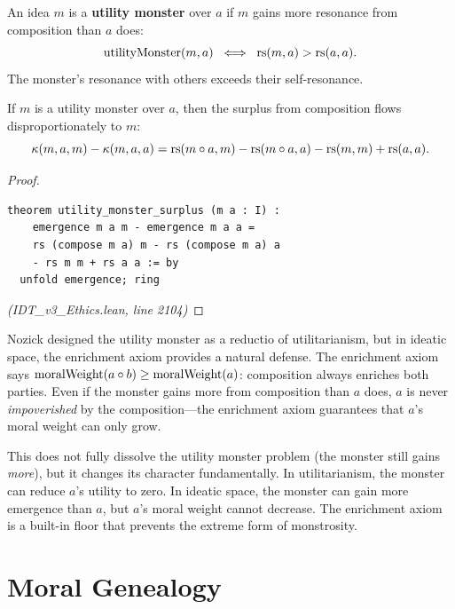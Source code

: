 \begin{definition}
\label{def:utility-monster}
An idea $m$ is a \textbf{utility monster} over $a$ if $m$ gains more
resonance from composition than $a$ does:
\[
  \mathrm{utilityMonster}(m, a) \;\iff\; \mathrm{rs}(m, a) > \mathrm{rs}(a, a).
\]
The monster's resonance with others exceeds their self-resonance.
\end{definition}

\begin{theorem}
\label{thm:monster-extraction}
If $m$ is a utility monster over $a$, then the surplus from composition
flows disproportionately to $m$:
\[
  \kappa(m, a, m) - \kappa(m, a, a) = \mathrm{rs}(m \circ a, m) - \mathrm{rs}(m \circ a, a) - \mathrm{rs}(m, m) + \mathrm{rs}(a, a).
\]
\end{theorem}

\begin{proof}
\begin{lstlisting}
theorem utility_monster_surplus (m a : I) :
    emergence m a m - emergence m a a =
    rs (compose m a) m - rs (compose m a) a
    - rs m m + rs a a := by
  unfold emergence; ring
\end{lstlisting}
\textit{(IDT\_v3\_Ethics.lean, line 2104)}
\end{proof}

\begin{interpretation}
Nozick designed the utility monster as a reductio of utilitarianism, but
in ideatic space, the enrichment axiom provides a natural defense. The
enrichment axiom says $\mathrm{moralWeight}(a \circ b) \geq
\mathrm{moralWeight}(a)$: composition always enriches both parties.
Even if the monster gains more from composition than $a$ does, $a$ is
never \emph{impoverished} by the composition---the enrichment axiom
guarantees that $a$'s moral weight can only grow.

This does not fully dissolve the utility monster problem (the monster still
gains \emph{more}), but it changes its character fundamentally. In
utilitarianism, the monster can reduce $a$'s utility to zero. In ideatic
space, the monster can gain more emergence than $a$, but $a$'s moral
weight cannot decrease. The enrichment axiom is a built-in floor that
prevents the extreme form of monstrosity.
\end{interpretation}

\section{Moral Genealogy}
\label{sec:moral-genealogy}

